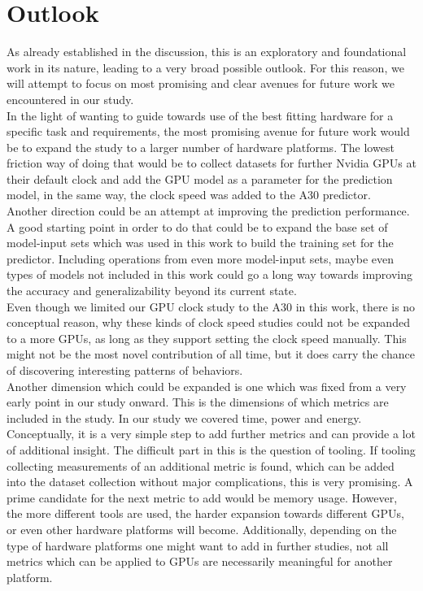 \section{Outlook}
As already established in the discussion, this is an exploratory and foundational work in its nature, leading to a very broad possible outlook. For this reason, we will attempt to focus on most promising and clear avenues for future work we encountered in our study. \\
In the light of wanting to guide towards use of the best fitting hardware for a specific task and requirements, the most promising avenue for future work would be to expand the study to a larger number of hardware platforms. The lowest friction way of doing that would be to collect datasets for further Nvidia GPUs at their default clock and add the GPU model as a parameter for the prediction model, in the same way, the clock speed was added to the A30 predictor. \\
Another direction could be an attempt at improving the prediction performance. A good starting point in order to do that could be to expand the base set of model-input sets which was used in this work to build the training set for the predictor. Including operations from even more model-input sets, maybe even types of models not included in this work could go a long way towards improving the accuracy and generalizability beyond its current state. \\
Even though we limited our GPU clock study to the A30 in this work, there is no conceptual reason, why these kinds of clock speed studies could not be expanded to a more GPUs, as long as they support setting the clock speed manually. This might not be the most novel contribution of all time, but it does carry the chance of discovering interesting patterns of behaviors.\\
Another dimension which could be expanded is one which was fixed from a very early point in our study onward. This is the dimensions of which metrics are included in the study. In our study we covered time, power and energy. Conceptually, it is a very simple step to add further metrics and can provide a lot of additional insight. The difficult part in this is the question of tooling. If tooling collecting measurements of an additional metric is found, which can be added into the dataset collection without major complications, this is very promising. A prime candidate for the next metric to add would be memory usage. However, the more different tools are used, the harder expansion towards different GPUs, or even other hardware platforms will become. Additionally, depending on the type of hardware platforms one might want to add in further studies, not all metrics which can be applied to GPUs are necessarily meaningful for another platform. \\
